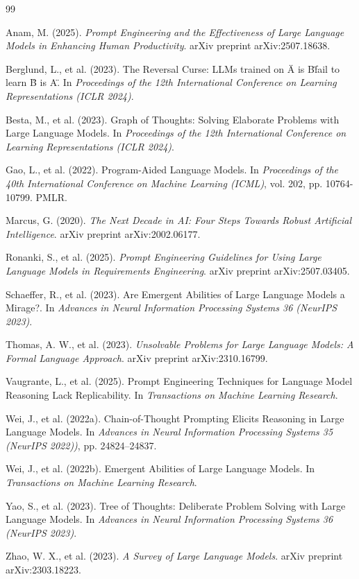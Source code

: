 \documentclass[11pt]{article}
\begin{document}
% 
% 
\begin{thebibliography}{99}

Anam, M. (2025). \emph{Prompt Engineering and the Effectiveness of Large Language Models in Enhancing Human Productivity}. arXiv preprint arXiv:2507.18638.

Berglund, L., et al. (2023). The Reversal Curse: LLMs trained on \"A is B\" fail to learn \"B is A\". In \emph{Proceedings of the 12th International Conference on Learning Representations (ICLR 2024)}.

Besta, M., et al. (2023). Graph of Thoughts: Solving Elaborate Problems with Large Language Models. In \emph{Proceedings of the 12th International Conference on Learning Representations (ICLR 2024)}.

Gao, L., et al. (2022). Program-Aided Language Models. In \emph{Proceedings of the 40th International Conference on Machine Learning (ICML)}, vol. 202, pp. 10764-10799. PMLR.

Marcus, G. (2020). \emph{The Next Decade in AI: Four Steps Towards Robust Artificial Intelligence}. arXiv preprint arXiv:2002.06177.

Ronanki, S., et al. (2025). \emph{Prompt Engineering Guidelines for Using Large Language Models in Requirements Engineering}. arXiv preprint arXiv:2507.03405.

Schaeffer, R., et al. (2023). Are Emergent Abilities of Large Language Models a Mirage?. In \emph{Advances in Neural Information Processing Systems 36 (NeurIPS 2023)}.

Thomas, A. W., et al. (2023). \emph{Unsolvable Problems for Large Language Models: A Formal Language Approach}. arXiv preprint arXiv:2310.16799.

Vaugrante, L., et al. (2025). Prompt Engineering Techniques for Language Model Reasoning Lack Replicability. In \emph{Transactions on Machine Learning Research}.

Wei, J., et al. (2022a). Chain-of-Thought Prompting Elicits Reasoning in Large Language Models. In \emph{Advances in Neural Information Processing Systems 35 (NeurIPS 2022))}, pp. 24824–24837.

Wei, J., et al. (2022b). Emergent Abilities of Large Language Models. In \emph{Transactions on Machine Learning Research}.

Yao, S., et al. (2023). Tree of Thoughts: Deliberate Problem Solving with Large Language Models. In \emph{Advances in Neural Information Processing Systems 36 (NeurIPS 2023)}.

Zhao, W. X., et al. (2023). \emph{A Survey of Large Language Models}. arXiv preprint arXiv:2303.18223.

\end{thebibliography}
\end{document}

